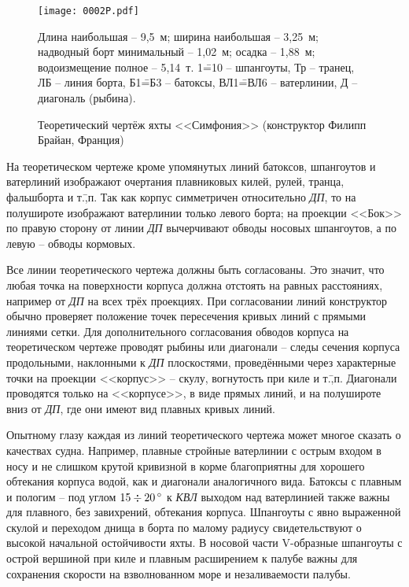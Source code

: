\begin{figure*}[htb]
   \centering
   \texttt{[image: 0002P.pdf]}
   \caption{Теоретический чертёж яхты <<Симфония>> (конструктор Филипп Брайан, Франция)}
   \label{fig:2}
   \centering{}
   \small  
   Длина наибольшая \--- 9,5~м;
   ширина наибольшая \--- 3,25~м;
   надводный борт минимальный \--- 1,02~м;
   осадка \--- 1,88~м;
   водоизмещение полное \--- 5,14~т.
   1\==10 \--- шпангоуты,
   Тр \--- транец,
   ЛБ \--- линия борта,
   Б1\==Б3 \--- батоксы,
   ВЛ1\==ВЛ6 \--- ватерлинии,
   Д \--- диагональ (рыбина).
\end{figure*}

На теоретическом чертеже кроме упомянутых линий батоксов, шпангоутов и
ватерлиний изображают очертания плавниковых килей, рулей, транца,
фальшборта и т.\=,п. Так как корпус симметричен относительно
\textit{ДП}, то на полушироте изображают ватерлинии только левого
борта; на проекции <<Бок>> по правую сторону от линии \textit{ДП}
вычерчивают обводы носовых шпангоутов, а по левую \--- обводы
кормовых.

Все линии теоретического чертежа должны быть согласованы. Это значит,
что любая точка на поверхности корпуса должна отстоять на равных
расстояниях, например от \textit{ДП} на всех трёх проекциях. При
согласовании линий конструктор обычно проверяет положение точек
пересечения кривых линий с прямыми линиями сетки. Для дополнительного
согласования обводов корпуса на теоретическом чертеже проводят рыбины
или диагонали \--- следы сечения корпуса продольными, наклонными к
\textit{ДП} плоскостями, проведёнными через характерные точки на
проекции <<корпус>> \--- скулу, вогнутость при киле и
т.\=,п. Диагонали проводятся только на <<корпусе>>, в виде прямых
линий, и на полушироте вниз от \textit{ДП}, где они имеют вид плавных
кривых линий.

Опытному глазу каждая из линий теоретического чертежа может многое
сказать о качествах судна. Например, плавные стройные ватерлинии с
острым входом в носу и не слишком крутой кривизной в корме
благоприятны для хорошего обтекания корпуса водой, как и диагонали
аналогичного вида. Батоксы с плавным и пологим \--- под углом
$15 \div 20\,^\circ$ к \textit{КВЛ} выходом над ватерлинией также важны
для плавного, без завихрений, обтекания корпуса. Шпангоуты с явно
выраженной скулой и переходом днища в борта по малому радиусу
свидетельствуют о высокой начальной остойчивости яхты. В носовой части
V-образные шпангоуты с острой вершиной при киле и плавным расширением
к палубе важны для сохранения скорости на взволнованном море и
незаливаемости палубы.

